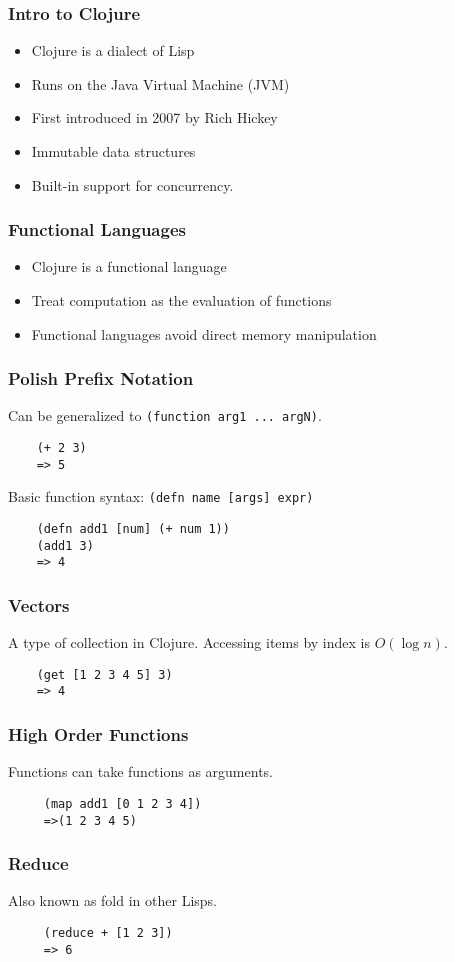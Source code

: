 \documentclass{beamer}
\newcommand{\comment}[1]{{\bf \tt  {#1}}}
\newcommand{\hfcomment}[1]{\textcolor{Teal}{\comment{Henry: {#1}}}}
\newcommand{\clocode}[1]{{\texttt {#1}}}
\begin{document}
\begin{frame}[fragile]
\frametitle{Intro to Clojure}
	\begin{itemize}
  	 \item Clojure is a dialect of Lisp
	\item Runs on the Java Virtual Machine (JVM)
  	 \item First introduced in 2007 by Rich Hickey
  	 \item Immutable data structures
	 \item Built-in support for concurrency.
	 	\end{itemize}
\end{frame}
\begin{frame}[fragile]
\frametitle{Functional Languages}
	\begin{itemize}
	 \item Clojure is a functional language
  	 \item Treat computation as the evaluation of functions
  	 \item Functional languages avoid direct memory manipulation
       \end{itemize}
\end{frame}
\begin{frame}[fragile]
\frametitle{Polish Prefix Notation}
Can be generalized to \clocode{(function arg1 ... argN)}.
	\begin{verbatim}
	(+ 2 3)
	=> 5
	\end{verbatim}
Basic function syntax: \clocode{(defn name [args] expr)}
	\begin{verbatim}
	(defn add1 [num] (+ num 1))
	(add1 3)
	=> 4
	\end{verbatim}
\end{frame}
\begin{frame}[fragile]
\frametitle{Vectors}

A type of collection in Clojure.
Accessing items by index is $O(\log n)$.
	\begin{verbatim}
	(get [1 2 3 4 5] 3)	
	=> 4
	\end{verbatim}
\end{frame}
\begin{frame}[fragile]
\frametitle{High Order Functions}
 Functions can take functions as arguments.
	\begin{verbatim}
	 (map add1 [0 1 2 3 4])
	 =>(1 2 3 4 5)
	\end{verbatim}
\end{frame}
\begin{frame}[fragile]
\frametitle{Reduce}
Also known as fold in other Lisps.
	\begin{verbatim}
	 (reduce + [1 2 3])
	 => 6
	\end{verbatim}
\end{frame}
\end{document}
